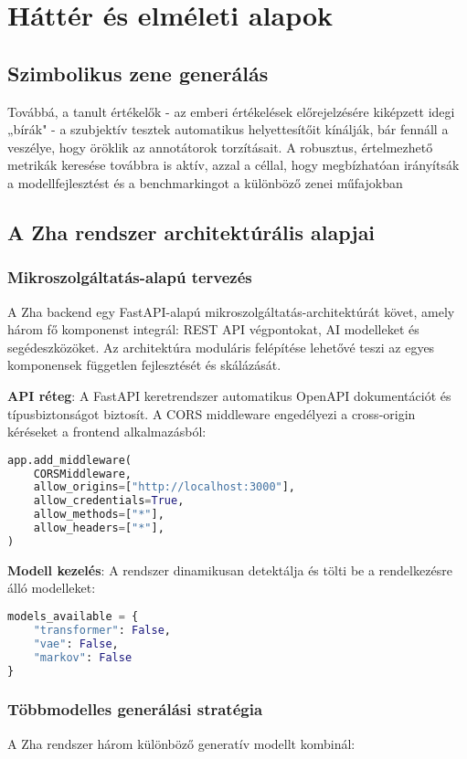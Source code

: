 \chapter{Háttér és elméleti alapok}
\section{Szimbolikus zene generálás}

Továbbá, a tanult értékelők - az emberi értékelések előrejelzésére kiképzett idegi „bírák" - a szubjektív tesztek automatikus helyettesítőit kínálják, bár fennáll a veszélye, hogy öröklik az annotátorok torzításait. A robusztus, értelmezhető metrikák keresése továbbra is aktív, azzal a céllal, hogy megbízhatóan irányítsák a modellfejlesztést és a benchmarkingot a különböző zenei műfajokban

\section{A Zha rendszer architektúrális alapjai}
\subsection{Mikroszolgáltatás-alapú tervezés}
A Zha backend egy FastAPI-alapú mikroszolgáltatás-architektúrát követ, amely három fő komponenst integrál: REST API végpontokat, AI modelleket és segédeszközöket. Az architektúra moduláris felépítése lehetővé teszi az egyes komponensek független fejlesztését és skálázását.

\textbf{API réteg}: A FastAPI keretrendszer automatikus OpenAPI dokumentációt és típusbiztonságot biztosít. A CORS middleware engedélyezi a cross-origin kéréseket a frontend alkalmazásból:
\begin{lstlisting}[language=Python]
app.add_middleware(
    CORSMiddleware,
    allow_origins=["http://localhost:3000"],
    allow_credentials=True,
    allow_methods=["*"],
    allow_headers=["*"],
)
\end{lstlisting}

\textbf{Modell kezelés}: A rendszer dinamikusan detektálja és tölti be a rendelkezésre álló modelleket:
\begin{lstlisting}[language=Python]
models_available = {
    "transformer": False,
    "vae": False,
    "markov": False
}
\end{lstlisting}

\subsection{Többmodelles generálási stratégia}
A Zha rendszer három különböző generatív modellt kombinál:

